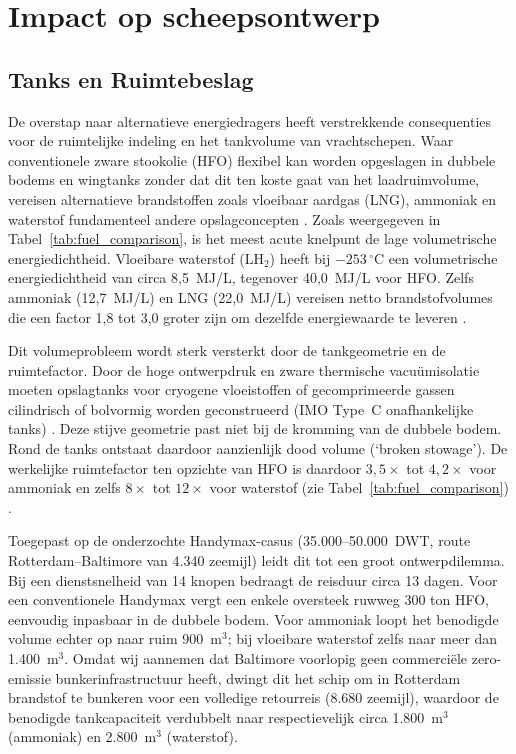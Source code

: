 \documentclass[a4paper]{IMDC2024}
\begin{document}
\section{Impact op scheepsontwerp}
\label{sec:ontwerpimpact}

\subsection{Tanks en Ruimtebeslag}
De overstap naar alternatieve energiedragers heeft verstrekkende consequenties voor de ruimtelijke indeling en het tankvolume van vrachtschepen. Waar conventionele zware stookolie (HFO) flexibel kan worden opgeslagen in dubbele bodems en wingtanks zonder dat dit ten koste gaat van het laadruimvolume, vereisen alternatieve brandstoffen zoals vloeibaar aardgas (LNG), ammoniak en waterstof fundamenteel andere opslagconcepten \citep{mckenney2024}. Zoals weergegeven in Tabel~\ref{tab:fuel_comparison}, is het meest acute knelpunt de lage volumetrische energiedichtheid. Vloeibare waterstof ($\text{LH}_2$) heeft bij $-253\,^{\circ}\mathrm{C}$ een volumetrische energiedichtheid van circa 8,5~MJ/L, tegenover 40,0~MJ/L voor HFO. Zelfs ammoniak (12,7~MJ/L) en LNG (22,0~MJ/L) vereisen netto brandstofvolumes die een factor 1,8 tot 3,0 groter zijn om dezelfde energiewaarde te leveren \citep{vanhoecke2021challenges}.

Dit volumeprobleem wordt sterk versterkt door de tankgeometrie en de ruimtefactor. Door de hoge ontwerpdruk en zware thermische vacuümisolatie moeten opslagtanks voor cryogene vloeistoffen of gecomprimeerde gassen cilindrisch of bolvormig worden geconstrueerd (IMO Type~C onafhankelijke tanks) \citep{vanhoecke2021challenges,akman2024}. Deze stijve geometrie past niet bij de kromming van de dubbele bodem. Rond de tanks ontstaat daardoor aanzienlijk dood volume (`broken stowage'). De werkelijke ruimtefactor ten opzichte van HFO is daardoor $3,5\times$ tot $4,2\times$ voor ammoniak en zelfs $8\times$ tot $12\times$ voor waterstof (zie Tabel~\ref{tab:fuel_comparison}) \citep{mckenney2024,dimicco2024}.

    Toegepast op de onderzochte Handymax-casus (35.000--50.000~DWT, route Rotterdam--Baltimore van 4.340 zeemijl) leidt dit tot een groot ontwerpdilemma. Bij een dienstsnelheid van 14 knopen bedraagt de reisduur circa 13 dagen. Voor een conventionele Handymax vergt een enkele oversteek ruwweg 300 ton HFO, eenvoudig inpasbaar in de dubbele bodem. Voor ammoniak loopt het benodigde volume echter op naar ruim 900~m$^3$; bij vloeibare waterstof zelfs naar meer dan 1.400~m$^3$. Omdat wij aannemen dat Baltimore voorlopig geen commerciële zero-emissie bunkerinfrastructuur heeft, dwingt dit het schip om in Rotterdam brandstof te bunkeren voor een volledige retourreis (8.680 zeemijl), waardoor de benodigde tankcapaciteit verdubbelt naar respectievelijk circa 1.800~m$^3$ (ammoniak) en 2.800~m$^3$ (waterstof).
\end{document}
